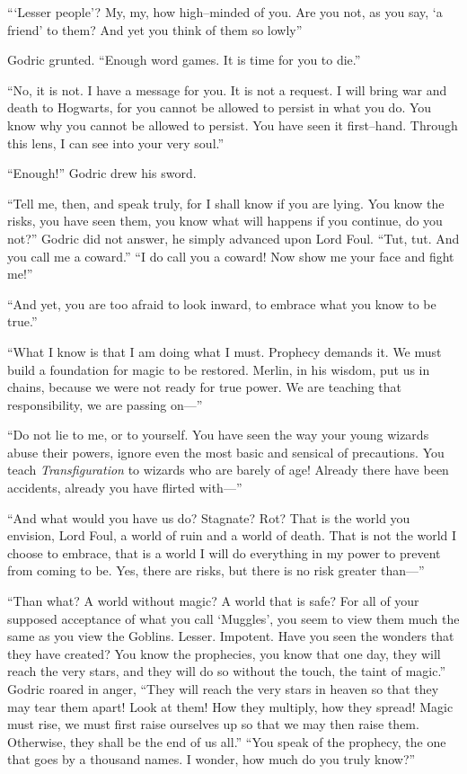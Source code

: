 “‘Lesser people’? My, my, how high\mbox{--}minded of you. Are you not, as you say, ‘a friend’ to them? And yet you think of them so lowly{\el}”

Godric grunted. “Enough word games. It is time for you to die.”

“No, it is not. I have a message for you. It is not a request. I will bring war and death to Hogwarts, for you cannot be allowed to persist in what you do. You know why you cannot be allowed to persist. You have seen it first\mbox{--}hand. Through this lens, I can see into your very soul.”

“Enough!” Godric drew his sword.

“Tell me, then, and speak truly, for I shall know if you are lying. You know the risks, you have seen them, you know what will happens if you continue, do you not?” Godric did not answer, he simply advanced upon Lord Foul. “Tut, tut. And you call me a coward.”
\SmallVSpace
“I do call you a coward! Now show me your face and fight me!”

“And yet, you are too afraid to look inward, to embrace what you know to be true.”

“What I know is that I am doing what I must. Prophecy demands it. We must build a foundation for magic to be restored. Merlin, in his wisdom, put us in chains, because we were not ready for true power. We are teaching that responsibility, we are passing on\mbox{---}”

“Do not lie to me, or to yourself. You have seen the way your young wizards abuse their powers, ignore even the most basic and sensical of precautions. You teach \emph{Transfiguration} to wizards who are barely of age! Already there have been accidents, already you have flirted with\mbox{---}”

“And what would you have us do? Stagnate? Rot? That is the world you envision, Lord Foul, a world of ruin and a world of death. That is not the world I choose to embrace, that is a world I will do everything in my power to prevent from coming to be. Yes, there are risks, but there is no risk greater than\mbox{---}”

“Than what? A world without magic? A world that is safe? For all of your supposed acceptance of what you call ‘Muggles’, you seem to view them much the same as you view the Goblins. Lesser. Impotent. Have you seen the wonders that they have created? You know the prophecies, you know that one day, they will reach the very stars, and they will do so without the touch, the taint of magic.”
\SmallVSpace
Godric roared in anger, “They will reach the very stars in heaven so that they may tear them apart! Look at them! How they multiply, how they spread! Magic must rise, we must first raise ourselves up so that we may then raise them.\\Otherwise, they shall be the end of us all.”
\SmallVSpace
“You speak of the prophecy, the one that goes by a thousand names. I wonder, how much do you truly know?”

